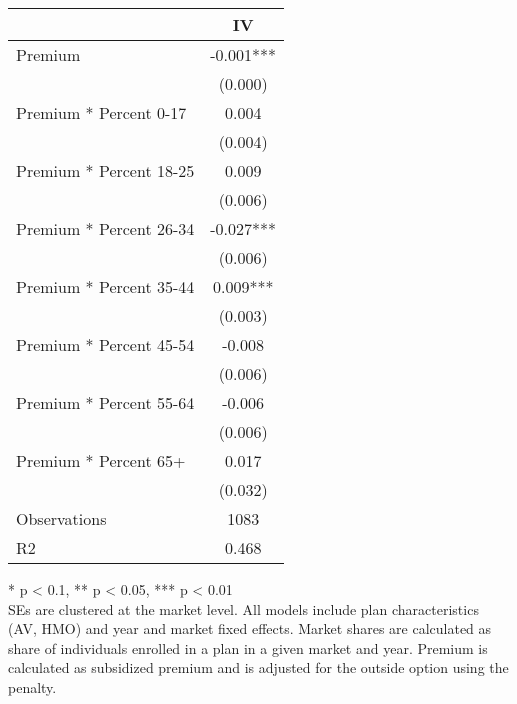 \setlength{\LTpost}{0mm}
\begin{longtable}{lc}
\toprule
  & IV \\ 
\midrule\addlinespace[2.5pt]
Premium & -0.001*** \\ 
 & (0.000) \\ 
Premium * Percent 0-17 & 0.004 \\ 
 & (0.004) \\ 
Premium * Percent 18-25 & 0.009 \\ 
 & (0.006) \\ 
Premium * Percent 26-34 & -0.027*** \\ 
 & (0.006) \\ 
Premium * Percent 35-44 & 0.009*** \\ 
 & (0.003) \\ 
Premium * Percent 45-54 & -0.008 \\ 
 & (0.006) \\ 
Premium * Percent 55-64 & -0.006 \\ 
 & (0.006) \\ 
Premium * Percent 65+ & 0.017 \\ 
 & (0.032) \\ 
Observations & 1083 \\ 
R2 & 0.468 \\ 
\bottomrule
\end{longtable}
\begin{minipage}{\linewidth}
* p < 0.1, ** p < 0.05, *** p < 0.01\\
SEs are clustered at the market level. All models include plan characteristics (AV, HMO) and year and market fixed effects. 
                   Market shares are calculated as share of individuals enrolled in a plan in a given market and year. 
                   Premium is calculated as subsidized premium and is adjusted for the outside option using the penalty.\\
\end{minipage}

